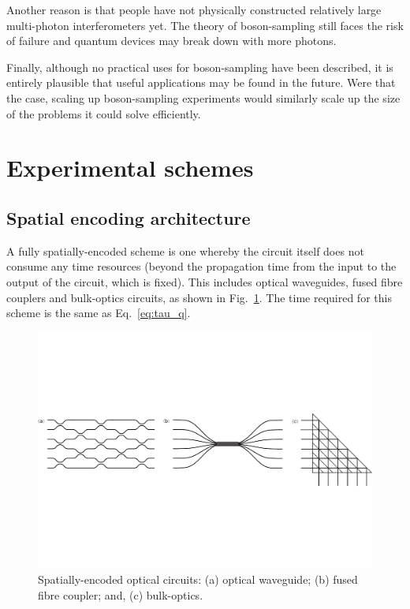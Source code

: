 \documentclass[aps,rmp,twocolumn,amsmath,amssymb,nofootinbib,superscriptaddress]{revtex4}
\begin{document}
Another reason is that people have not physically constructed relatively large multi-photon interferometers yet. The theory of boson-sampling still faces the risk of failure and quantum devices may break down with more photons.

Finally, although no practical uses for boson-sampling have been described, it is entirely plausible that useful applications may be found in the future. Were that the case, scaling up boson-sampling experiments would similarly scale up the size of the problems it could solve efficiently.

\section{Experimental schemes} \label{sec:exp_schemes}

\subsection{Spatial encoding architecture}

A fully spatially-encoded scheme is one whereby the circuit itself does not consume any time resources (beyond the propagation time from the input to the output of the circuit, which is fixed). This includes optical waveguides, fused fibre couplers and bulk-optics circuits, as shown in Fig.~\ref{fig:space_encoding}. The time required for this scheme is the same as Eq.~\ref{eq:tau_q}.

\begin{figure}[!htb]
\includegraphics[width=\columnwidth]{space_encoding}
\caption{Spatially-encoded optical circuits: (a) optical waveguide; (b) fused fibre coupler; and, (c) bulk-optics.} \label{fig:space_encoding}
\end{figure}
\end{document}

